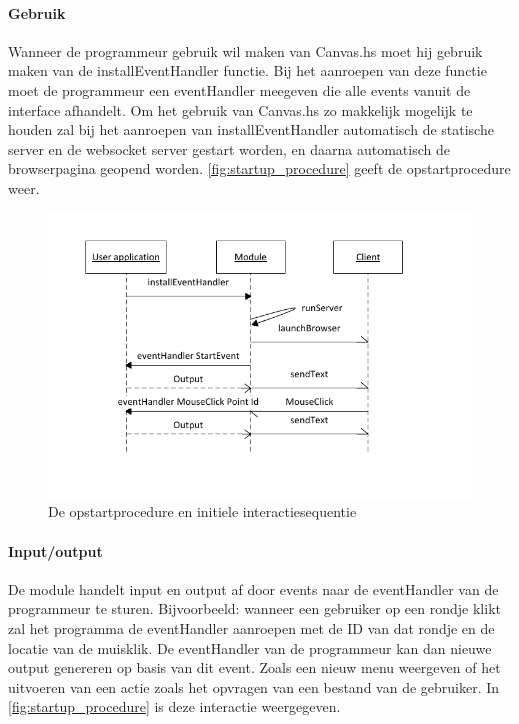 \paragraph{Gebruik} Wanneer de programmeur gebruik wil maken van Canvas.hs moet hij gebruik maken van de installEventHandler functie. Bij het aanroepen van deze functie moet de programmeur een eventHandler meegeven die alle events vanuit de interface afhandelt. Om het gebruik van Canvas.hs zo makkelijk mogelijk te houden zal bij het aanroepen van installEventHandler automatisch de statische server en de websocket server gestart worden, en daarna automatisch de browserpagina geopend worden. \autoref{fig:startup_procedure} geeft de opstartprocedure weer.

\begin{figure}
\begin{center}
\includegraphics[keepaspectratio,width=\textwidth]{./images/module_startup_procedure_interaction.pdf}
\caption{De opstartprocedure en initiele interactiesequentie}
\label{fig:startup_procedure}
\end{center}
\end{figure}

\paragraph{Input/output}
De module handelt input en output af door events naar de eventHandler van de programmeur te sturen. Bijvoorbeeld: wanneer een gebruiker op een rondje klikt zal het programma de eventHandler aanroepen met de ID van dat rondje en de locatie van de muisklik. De eventHandler van de programmeur kan dan nieuwe output genereren op basis van dit event. Zoals een nieuw menu weergeven of het uitvoeren van een actie zoals het opvragen van een bestand van de gebruiker. In \autoref{fig:startup_procedure} is deze interactie weergegeven.

